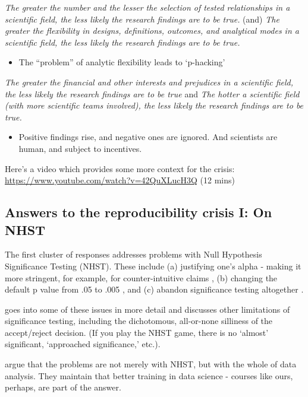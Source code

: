 \documentclass[]{book}
\providecommand{\tightlist}{%
  \setlength{\itemsep}{0pt}\setlength{\parskip}{0pt}}
\theoremstyle{definition}
\theoremstyle{definition}
\theoremstyle{definition}
\theoremstyle{remark}
\begin{document}
\emph{The greater the number and the lesser the selection of tested
relationships in a scientific field, the less likely the research
findings are to be true.} (and) \emph{The greater the flexibility in
designs, definitions, outcomes, and analytical modes in a scientific
field, the less likely the research findings are to be true.}

\begin{itemize}
\tightlist
\item
  The ``problem'' of analytic flexibility leads to `p-hacking'
\end{itemize}

\emph{The greater the financial and other interests and prejudices in a
scientific field, the less likely the research findings are to be true}
and \emph{The hotter a scientific field (with more scientific teams
involved), the less likely the research findings are to be true.}

\begin{itemize}
\tightlist
\item
  Positive findings rise, and negative ones are ignored. And scientists
  are human, and subject to incentives.
\end{itemize}

Here's a video which provides some more context for the crisis:
\url{https://www.youtube.com/watch?v=42QuXLucH3Q} (12 mins)

\subsection{Answers to the reproducibility crisis I: On
NHST}\label{answers-to-the-reproducibility-crisis-i-on-nhst}

The first cluster of responses addresses problems with Null Hypothesis
Significance Testing (NHST). These include (a) justifying one's alpha -
making it more stringent, for example, for counter-intuitive claims
\citep{grange2018justify}, (b) changing the default p value from .05 to
.005 \citep{benjamin2017redefine}, and (c) abandon significance testing
altogether \citep{mcshane2017abandon}.

\citet{szucs2017null} goes into some of these issues in more detail and
discusses other limitations of significance testing, including the
dichotomous, all-or-none silliness of the accept/reject decision. (If
you play the NHST game, there is no `almost' significant, `approached
significance,' etc.).

\citet{leek2015statistics} argue that the problems are not merely with
NHST, but with the whole of data analysis. They maintain that better
training in data science - courses like ours, perhaps, are part of the
answer.
\end{document}
